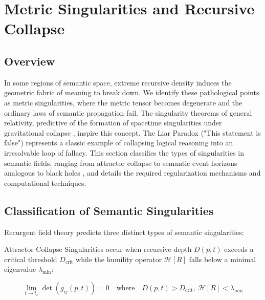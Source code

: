 \chapter{Metric Singularities and Recursive Collapse}
\label{12:metric_singularities_and_recursive_collapse}


\section{Overview}
\label{12.1:overview}

In some regions of semantic space, extreme recursive density induces the geometric fabric of meaning to break down. We identify these pathological points as metric singularities, where the metric tensor becomes degenerate and the ordinary laws of semantic propagation fail. The singularity theorems of general relativity, predictive of the formation of spacetime singularities under gravitational collapse \autocite{Penrose1965}, inspire this concept. The Liar Paradox ("This statement is false") represents a classic example of collapsing logical reasoning into an irresolvable loop of fallacy. This section classifies the types of singularities in semantic fields, ranging from attractor collapse to semantic event horizons analogous to black holes \autocite{Hawking1974}, and details the required regularization mechanisms and computational techniques.


\section{Classification of Semantic Singularities}
\label{12.2:classification_of_semantic_singularities}

Recurgent field theory predicts three distinct types of semantic singularities:

Attractor Collapse Singularities occur when recursive depth \(D(p, t)\) exceeds a critical threshold \(D_{\text{crit}}\) while the humility operator \(\mathcal{H}[R]\) falls below a minimal eigenvalue \(\lambda_{\text{min}}\):

\begin{equation}
\lim_{t \to t_c} \det(g_{ij}(p, t)) = 0 \quad \text{where} \quad D(p, t) > D_{\text{crit}},\ \mathcal{H}[R] < \lambda_{\text{min}}
\end{equation}

